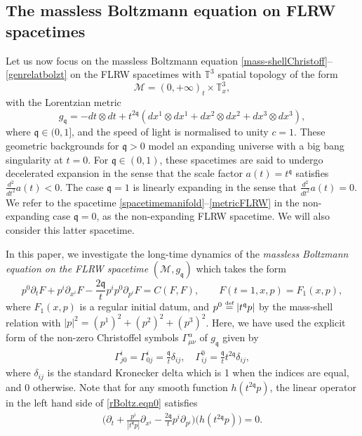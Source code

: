 \documentclass[reqno]{amsart}
\newcommand{\eqdef }{\overset{\mbox{\tiny{def}}}{=}}
\newcommand{\pv}{p}
\newcommand{\qq}{\mathfrak{q}}
\newcommand{\tq}{t^{\qq}}
\newcommand{\tqq}{t^{2\qq}}
\theoremstyle{definition}
\numberwithin{equation}{section}
\numberwithin{theorem}{section}
\begin{document}
\subsection{The massless Boltzmann equation on FLRW spacetimes}

Let us now focus on the massless Boltzmann equation \eqref{mass-shellChristoff}--\eqref{genrelatbolzt} on the FLRW spacetimes with \(\mathbb{T}^3\) spatial topology of the form
\begin{equation}
\mathcal{M}=(0,+\infty)_t\times \mathbb{T}^3_x,\label{spacetimemanifold}
\end{equation}
with the Lorentzian metric
\begin{equation}
g_{\qq}=-dt\otimes dt+t^{2\qq}(dx^1\otimes dx^1+dx^2\otimes dx^2+dx^3\otimes dx^3),   \label{metricFLRW} 
\end{equation}
where \(\qq\in (0,1]\), and the speed of light is normalised to unity $c=1$. These geometric backgrounds for \(\qq>0\) model an expanding universe with a big bang singularity at \(t= 0\). For \(\qq\in (0,1)\), these spacetimes are said to undergo decelerated expansion in the sense that the scale factor \(a(t)=t^{\qq}\) satisfies \(\frac{d^2}{dt^2}a(t)<0\).  The case \(\qq=1\) is linearly expanding in the sense that \(\frac{d^2}{dt^2}a(t)=0\). We refer to the spacetime \eqref{spacetimemanifold}--\eqref{metricFLRW} in the non-expanding case \(\qq=0\), as the non-expanding FLRW spacetime. We will also consider this latter spacetime.

In this paper, we investigate the long-time dynamics of the \emph{massless Boltzmann equation on the FLRW spacetime} \((\mathcal{M},g_{\qq})\) which takes the form
\begin{equation}
    p^0\partial_t F+\pv^i \partial_{x^i} F
    - \frac{2 \qq}{t} p^ip^0 \partial_{p^i} F = C(F,F),  \qquad F(t=1,x,p)=F_1(x,p),
\label{rBoltz.eqn0}
\end{equation}
where \(F_1(x,p)\) is a regular initial datum, and \(p^0\eqdef |t^\qq\pv|\) by the mass-shell relation with \(|p|^2=(p^1)^2+(p^2)^2+(p^3)^2\). Here, we have used the explicit form of the non-zero Christoffel symbols \(\Gamma_{\mu\nu}^{\alpha}\) of \(g_{\qq}\) given by
\begin{align*}
        \Gamma^i_{j0}
    =    \Gamma^i_{0j}
    =
    \frac{\qq}{t} \delta_{ij},
    \quad
    \Gamma^0_{ij}
    =
    \frac{\qq}{t} t^{2 \qq} \delta_{ij},
\end{align*}
where \(\delta_{ij}\) is the standard Kronecker delta which is 1 when the indices are equal, and 0 otherwise. Note that for any smooth function $h(\tqq \pv)$, the linear operator in the left hand side of \eqref{rBoltz.eqn0} satisfies
\begin{align} \label{nullRHStp}
       \Big(  \partial_t  +\frac{\pv^i}{|\tq \pv|}\partial_{x^i}
    -\frac{2\qq }{t} p^i \partial_{p^i} \Big) \big(h(\tqq \pv)\big) = 0.
\end{align}
\end{document}
